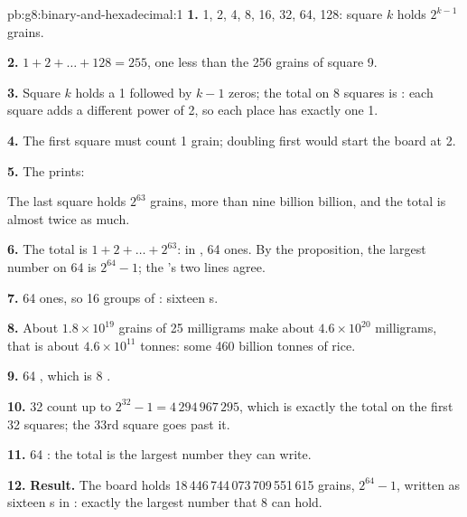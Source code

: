 \begin{solution}{pb:g8:binary-and-hexadecimal:1}
\textbf{1.} 1, 2, 4, 8, 16, 32, 64, 128: square $k$ holds $2^{k-1}$ grains.

\textbf{2.} $1 + 2 + \dots + 128 = 255$, one less than the 256 grains of
square 9.

\textbf{3.} Square $k$ holds a 1 followed by $k - 1$ zeros; the total on 8
squares is : each square adds a different power of 2, so each
place has exactly one 1.

\textbf{4.} The first square must count 1 grain; doubling first would start
the board at 2.

\textbf{5.} The  prints:

\label{out:g8:binary-and-hexadecimal:grains}

The last square holds $2^{63}$ grains, more than nine billion billion, and
the total is almost twice as much.

\textbf{6.} The total is $1 + 2 + \dots + 2^{63}$: in , 64 ones. By the
proposition, the largest number on 64  is $2^{64} - 1$; the 's two
lines agree.

\textbf{7.} 64 ones, so 16 groups of : sixteen s.

\textbf{8.} About $1.8 \times 10^{19}$ grains of 25 milligrams make about
$4.6 \times 10^{20}$ milligrams, that is about $4.6 \times 10^{11}$ tonnes:
some 460 billion tonnes of rice.

\textbf{9.} 64 , which is 8 .

\textbf{10.} 32  count up to $2^{32} - 1 = 4\,294\,967\,295$, which is
exactly the total on the first 32 squares; the 33rd square goes past it.

\textbf{11.} 64 : the total is the largest number they can write.

\textbf{12.} \textbf{Result.} The board holds 18\,446\,744\,073\,709\,551\,615
grains, $2^{64} - 1$, written as sixteen s in : exactly the
largest number that 8  can hold.
\end{solution}
